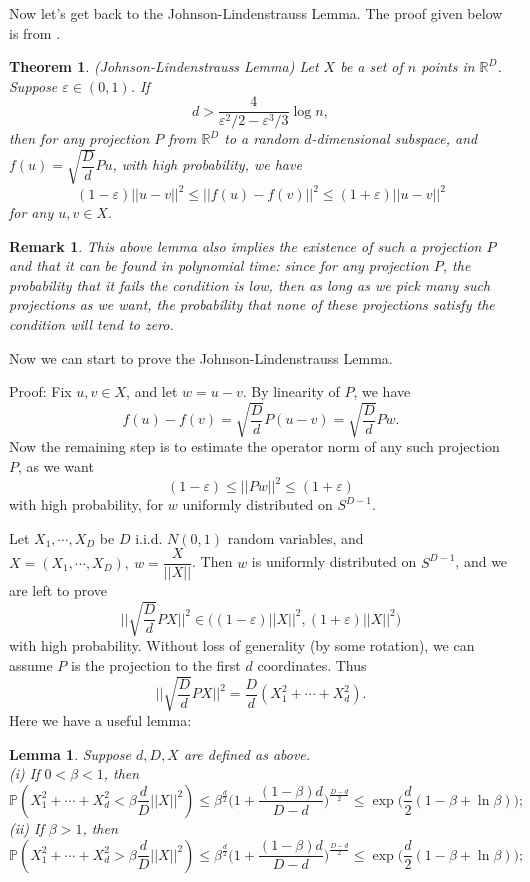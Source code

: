 \documentclass[12pt]{article}
\theoremstyle{plain}
\newtheorem*{theorem}{Theorem}
\newtheorem*{lemma}{Lemma}
\newtheorem*{remark}{Remark}
\begin{document}
 Now let's get back to the Johnson-Lindenstrauss Lemma. The proof given below is from \cite{johnson}.
 
 \begin{theorem}
 	(Johnson-Lindenstrauss Lemma) Let $X$ be a set of $n$ points in $\mathbb{R}^D$. Suppose $\varepsilon\in (0,1)$. If \[d>\dfrac{4}{\varepsilon^2/2-\varepsilon^3/3}\log n,   \]  then for any projection $P$ from $\mathbb{R}^D$ to a random $d$-dimensional subspace, and $f(u)=\sqrt{\dfrac{D}{d}}Pu$, with high probability, we have \[
 	(1-\varepsilon)||u-v||^2 \le ||f(u)-f(v)||^2 \le (1+\varepsilon) ||u-v||^2  \] for any $u,v\in X.$
 	
 \end{theorem}
 
 \begin{remark}
 	This above lemma also implies the existence of such a projection $P$ and that it can be found in polynomial time: since for any projection $P$, the probability that it fails the condition is low, then as long as we pick many such projections as we want, the probability that none of these projections satisfy the condition will tend to zero.
 \end{remark}

Now we can start to prove the Johnson-Lindenstrauss Lemma.

Proof: Fix $u,v\in X$, and let $w=u-v$. By linearity of $P$, we have $$f(u)-f(v)=\sqrt{\dfrac{D}{d}}P(u-v)=\sqrt{\dfrac{D}{d}}Pw.$$
Now the remaining step is to estimate the operator norm of any such projection $P$, as we want \[ (1-\varepsilon) \le ||Pw||^2 \le (1+\varepsilon) 
\] with high probability, for $w$ uniformly distributed on $S^{D-1}$.

Let $X_1,\cdots, X_D$ be $D$ i.i.d. $N(0,1)$ random variables, and $X=(X_1,\cdots,X_D),~w=\dfrac{X}{||X||}$. Then $w$ is uniformly distributed on $S^{D-1}$, and we are left to prove $$||\sqrt{\dfrac{D}{d}}PX||^2 \in \big((1-\varepsilon)||X||^2, (1+\varepsilon)||X||^2     \big)$$ with high probability. Without loss of generality (by some rotation), we can assume $P$ is the projection to the first $d$ coordinates. Thus $$||\sqrt{\dfrac{D}{d}}PX||^2=\dfrac{D}{d}(X_1^2+\cdots+X_d^2).$$Here we have a useful lemma:

\begin{lemma}
	Suppose $d,D,X$ are defined as above.\\(i) If $0<\beta<1$, then \[\mathbb{P}(X_1^2+\cdots+X_d^2<\beta \dfrac{d}{D}||X||^2) \le \beta^{\frac{d}{2}}\big(1+\dfrac{(1-\beta)d}{D-d}\big)^{\frac{D-d}{2}} \le \exp\big(\dfrac{d}{2}(1-\beta+\ln \beta)  \big)  ;\]
	(ii) If $\beta>1$, then \[\mathbb{P}(X_1^2+\cdots+X_d^2>\beta \dfrac{d}{D}||X||^2) \le \beta^{\frac{d}{2}}\big(1+\dfrac{(1-\beta)d}{D-d}\big)^{\frac{D-d}{2}} \le \exp\big(\dfrac{d}{2}(1-\beta+\ln \beta)  \big)  ;\]
\end{lemma}
 
\end{document}
